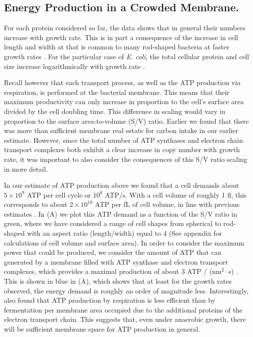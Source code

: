 \subsection{Energy Production in a Crowded Membrane.}

For each protein considered so far, the data shows that in general their numbers
increase with growth rate. This is in part a consequence of the increase in cell
length and width at that is common to many rod-shaped bacteria at faster growth
rates \citep{ojkic2019, harris2018}. For the particular case of \textit{E.
coli}, the total cellular protein and cell size increase logarithmically with
growth rate \citep{schaechter1958, si2017}.

Recall however that each transport process, as well as the ATP production via
respiration, is performed at the bacterial membrane. This means that their
maximum productivity can only increase in proportion to the cell's surface
area divided by the cell doubling time. This difference in scaling would vary
in proportion to the surface area-to-volume (S/V) ratio. Earlier we found
that there was more than sufficient membrane real estate for carbon intake in
our earlier estimate. However, since the total number of ATP synthases and
electron chain transport complexes both exhibit a clear increase in copy
number with growth rate, it was important to also consider the consequences
of this S/V ratio scaling in more detail.

In our estimate of ATP production above we found that a cell demands about
$5 \times 10^9$ ATP per cell cycle or $10^6$ ATP/s. With a cell volume of roughly 1 fl, this
corresponds to about $2 \times 10^{10}$ ATP per fL of cell volume, in line  with
previous estimates \citep{stouthamer1977, szenk2017}. In  (A)
we plot this ATP demand as a function of the S/V ratio in green, where we have
considered a range of cell shapes from spherical to rod-shaped with an aspect
ratio (length/width) equal to 4 (See appendix for calculations of cell volume
and surface area).  In order to consider the maximum power that could be
produced, we consider the amount of ATP that can generated by a membrane filled
with ATP synthase and electron transport complexes, which provides a maximal
production of about 3 ATP / (nm$^2 \cdot$s) \citep{szenk2017}. This is shown in
blue in (A), which shows that at least for the growth rates
observed, the energy demand is roughly an order of magnitude less.
Interestingly, \cite{szenk2017} also found that ATP production by
respiration is less efficient than by fermentation per membrane area occupied
due to the additional proteins of the electron transport chain. This suggests
that, even under anaerobic growth, there will be sufficient membrane space for
ATP production in general.


